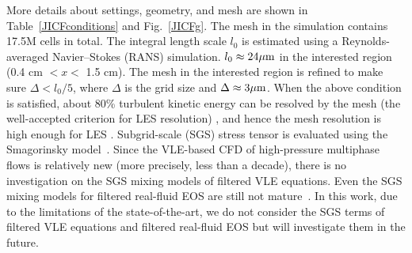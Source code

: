 More details about settings, geometry, and mesh are shown in Table~\ref{JICFconditions} and Fig.~\ref{JICFg}. 
The mesh in the simulation contains 17.5M cells in total. The integral length scale $l_0$ is estimated using a Reynolds-averaged Navier–Stokes (RANS) simulation. $l_0\approx24 \rm{\mu m}$ in the interested region (0.4 cm $< x <$ 1.5 cm). The mesh in the interested region is refined to make sure $\Delta<l_0/5$, where $\Delta$ is the grid size and $\Delta \approx 3 \rm{\mu m}$. When the above condition is satisfied, about 80\% turbulent kinetic energy can be resolved by the mesh (the well-accepted criterion for LES resolution) \cite{gerasimov2016quick}, and hence the mesh resolution is high enough for LES \cite{pope2004ten}. Subgrid-scale (SGS) stress tensor is evaluated using the Smagorinsky model~\cite{smagorinsky1963general}.  Since the VLE-based CFD of high-pressure multiphase flows is relatively new (more precisely, less than a decade), there is no investigation on the SGS mixing models of filtered VLE equations. Even the SGS mixing models for filtered real-fluid EOS are still not mature~\cite{unnikrishnan2017subgrid,unnikrishnan2021subgrid}. %
In this work, due to the limitations of the state-of-the-art, we do not consider the SGS terms of filtered VLE equations and filtered real-fluid EOS but will investigate them in the future. %

